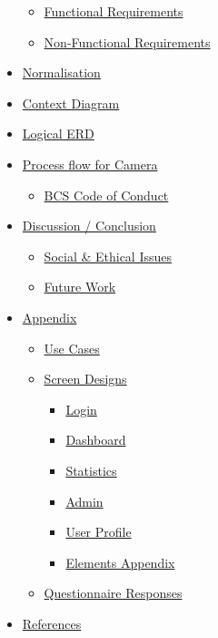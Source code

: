 \documentclass[
  english,
  a4paper,
,tablecaptionabove
]{scrartcl}
\providecommand{\tightlist}{%
  \setlength{\itemsep}{0pt}\setlength{\parskip}{0pt}}
\begin{document}
\begin{itemize}
  \begin{itemize}
  \tightlist
  \item
    \protect\hyperlink{functional-requirements}{Functional Requirements}
  \item
    \protect\hyperlink{non-functional-requirements}{Non-Functional
    Requirements}
  \end{itemize}
\item
  \protect\hyperlink{normalisation}{Normalisation}
\item
  \protect\hyperlink{context-diagram}{Context Diagram}
\item
  \protect\hyperlink{logical-erd}{Logical ERD}
\item
  \protect\hyperlink{process-flow-for-camera}{Process flow for Camera}

  \begin{itemize}
  \tightlist
  \item
    \protect\hyperlink{bcs-code-of-conduct}{BCS Code of Conduct}
  \end{itemize}
\item
  \protect\hyperlink{discussion--conclusion}{Discussion / Conclusion}

  \begin{itemize}
  \tightlist
  \item
    \protect\hyperlink{social--ethical-issues}{Social \& Ethical Issues}
  \item
    \protect\hyperlink{future-work}{Future Work}
  \end{itemize}
\item
  \protect\hyperlink{appendix}{Appendix}

  \begin{itemize}
  \tightlist
  \item
    \protect\hyperlink{use-cases}{Use Cases}
  \item
    \protect\hyperlink{screen-designs}{Screen Designs}

    \begin{itemize}
    \tightlist
    \item
      \protect\hyperlink{login}{Login}
    \item
      \protect\hyperlink{dashboard}{Dashboard}
    \item
      \protect\hyperlink{statistics}{Statistics}
    \item
      \protect\hyperlink{admin}{Admin}
    \item
      \protect\hyperlink{user-profile}{User Profile}
    \item
      \protect\hyperlink{elements-appendix}{Elements Appendix}
    \end{itemize}
  \item
    \protect\hyperlink{questionnaire-responses}{Questionnaire Responses}
  \end{itemize}
\item
  \protect\hyperlink{references}{References}
\end{itemize}
\end{document}
